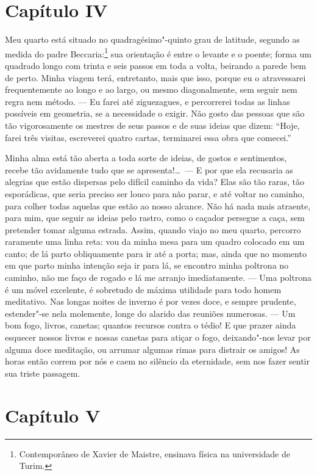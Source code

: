 \section*{Capítulo IV}

 Meu quarto está situado no quadragésimo"-quinto grau de latitude,
segundo as medida do padre Beccaria:\footnote{ Contemporâneo de Xavier
de Maistre, ensinava física na universidade de Turim.} sua
orientação é entre o levante e o poente; forma um quadrado longo com
trinta e seis passos em toda a volta, beirando a parede bem de perto.
Minha viagem terá, entretanto, mais que isso, porque eu o atravessarei
frequentemente ao longo e ao largo, ou mesmo diagonalmente, sem seguir
nem regra nem método. --- Eu farei até ziguezagues, e percorrerei todas
as linhas possíveis em geometria, se a necessidade o exigir. Não gosto
das pessoas que são tão vigorosamente os mestres de seus passos e de
suas ideias que dizem: ``Hoje, farei três visitas, escreverei quatro
cartas, terminarei essa obra que comecei.''

 Minha alma está tão aberta a toda sorte de ideias, de gostos e
sentimentos, recebe tão avidamente tudo que se apresenta!\ldots\ --- E por
que ela recusaria as alegrias que estão dispersas pelo difícil caminho
da vida? Elas são tão raras, tão esporádicas, que seria preciso ser
louco para não parar, e até voltar no caminho, para colher todas
aquelas que estão ao nosso alcance. Não há nada mais atraente, para
mim, que seguir as ideias pelo rastro, como o caçador persegue a caça,
sem pretender tomar alguma estrada. Assim, quando viajo no meu quarto,
percorro raramente uma linha reta: vou da minha mesa para um quadro
colocado em um canto; de lá parto obliquamente para ir até a porta;
mas, ainda que no momento em que parto minha intenção seja ir para lá,
se encontro minha poltrona no caminho, não me faço de rogado e lá me
arranjo imediatamente. --- Uma poltrona é um móvel excelente, é
sobretudo de máxima utilidade para todo homem meditativo. Nas longas
noites de inverno é por vezes doce, e sempre prudente, estender"-se nela
molemente, longe do alarido das reuniões numerosas. --- Um bom fogo,
livros, canetas; quantos recursos contra o tédio! E que prazer ainda
esquecer nossos livros e nossas canetas para atiçar o fogo,
deixando"-nos levar por alguma doce meditação, ou arrumar algumas rimas
para distrair os amigos! As horas então correm por nós e caem no
silêncio da eternidade, sem nos fazer sentir sua triste passagem. 

\section*{Capítulo V}

